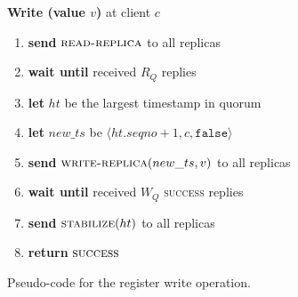 \begin{figure}[t]
  \begin{small}
    \textbf{Write (value $v$)} at client $c$

    \begin{enumerate}[itemsep=0pt,parsep=0pt]

    \item \textbf{send} $\textsc{read-replica}$ to all replicas

    \item \textbf{wait until} received $R_Q$ replies

    \item \textbf{let} $ht$ be the largest timestamp in quorum

    \item \textbf{let} $new\_ts$ be $\langle ht.seqno + 1, c, \texttt{false}\rangle$

    \item \textbf{send} $\textsc{write-replica}(new\_ts,v)$ to all replicas

    \item \textbf{wait until} received $W_Q$ \textsc{success} replies

    \item \textbf{send} $\textsc{stabilize}(ht)$ to all replicas
    \item \textbf{return} $\textsc{success}$
    \end{enumerate}

  \end{small}
  \caption{Pseudo-code for the register write operation.}\label{fig:abd-write}
\end{figure}
